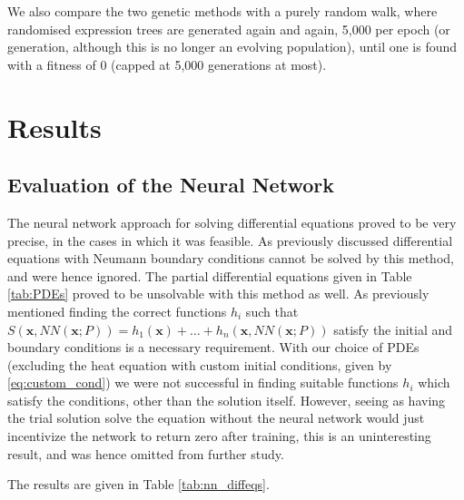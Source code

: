 \documentclass[aps,reprint,superscriptaddress,nofootinbib]{revtex4-2}
\begin{document}
We also compare the two genetic methods with a purely random walk, where randomised expression trees are generated again and again, 5,000 per epoch (or generation, although this is no longer an evolving population), until one is found with a fitness of 0 (capped at 5,000 generations at most).


\section{Results}
    

\subsection{Evaluation of the Neural Network}

    The neural network approach for solving differential equations proved to be very precise, in the cases in which it was feasible. As previously discussed differential equations with Neumann boundary conditions cannot be solved by this method, and were hence ignored. The partial differential equations given in Table \ref{tab:PDEs} proved to be unsolvable with this method as well. As previously mentioned finding the correct functions $h_i$ such that $S(\bm x, NN(\bm x; P)) = h_1(\bm x) + \dots + h_n(\bm x, NN(\bm x; P))$ satisfy the initial and boundary conditions is a necessary requirement. With our choice of PDEs (excluding the heat equation with custom initial conditions, given by \eqref{eq:custom_cond}) we were not successful in finding suitable functions $h_i$ which satisfy the conditions, other than the solution itself. However, seeing as having the trial solution solve the equation without the neural network would just incentivize the network to return zero after training, this is an uninteresting result, and was hence omitted from further study.
    
    The results are given in Table \ref{tab:nn_diffeqs}.
    
\end{document}
